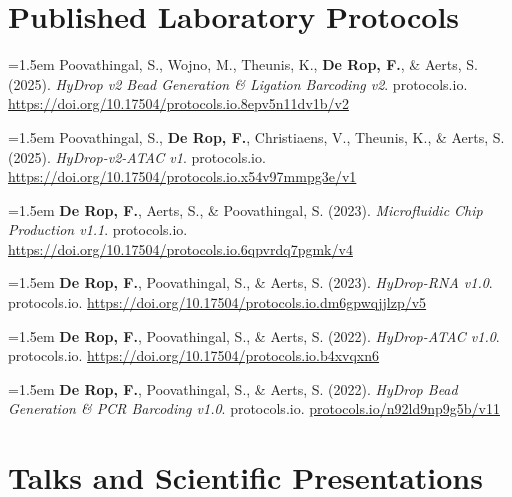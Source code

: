 \documentclass[10pt]{scrartcl}
\newcommand{\cvpublication}[1]{%
    \par\noindent\hangindent=1.5em\hangafter=1 #1\par\smallskip
}
\begin{document}
\section{Published Laboratory Protocols}

{\small

\cvpublication{Poovathingal, S., Wojno, M., Theunis, K., \textbf{De Rop, F.}, \& Aerts, S. (2025). \emph{HyDrop v2 Bead Generation \& Ligation Barcoding v2}. protocols.io. \url{https://doi.org/10.17504/protocols.io.8epv5n11dv1b/v2}}

\cvpublication{Poovathingal, S., \textbf{De Rop, F.}, Christiaens, V., Theunis, K., \& Aerts, S. (2025). \emph{HyDrop-v2-ATAC v1}. protocols.io. \url{https://doi.org/10.17504/protocols.io.x54v97mmpg3e/v1}}

\cvpublication{\textbf{De Rop, F.}, Aerts, S., \& Poovathingal, S. (2023). \emph{Microfluidic Chip Production v1.1}. protocols.io. \url{https://doi.org/10.17504/protocols.io.6qpvrdq7pgmk/v4}}

\cvpublication{\textbf{De Rop, F.}, Poovathingal, S., \& Aerts, S. (2023). \emph{HyDrop-RNA v1.0}. protocols.io. \url{https://doi.org/10.17504/protocols.io.dm6gpwqjjlzp/v5}}

\cvpublication{\textbf{De Rop, F.}, Poovathingal, S., \& Aerts, S. (2022). \emph{HyDrop-ATAC v1.0}. protocols.io. \url{https://doi.org/10.17504/protocols.io.b4xvqxn6}}

\cvpublication{\textbf{De Rop, F.}, Poovathingal, S., \& Aerts, S. (2022). \emph{HyDrop Bead Generation \& PCR Barcoding v1.0}. protocols.io. \href{https://www.protocols.io/view/hydrop-bead-generation-amp-pcr-barcoding-v1-0-n92ld9np9g5b/v11}{protocols.io/n92ld9np9g5b/v11}}

}

\section{Talks and Scientific Presentations}
\end{document}
